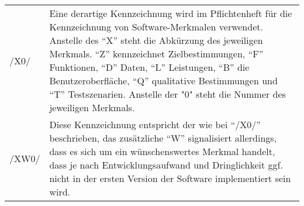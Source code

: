 \begin{tabular}{p{1.5cm}p{14.5cm}}

	/X0/	& Eine derartige Kennzeichnung wird im Pflichtenheft für die Kennzeichnung von Software-Merkmalen verwendet. Anstelle des "`X"' steht die Abkürzung des jeweiligen Merkmals. "`Z"' kennzeichnet Zielbestimmungen, "`F"' Funktionen, "`D"' Daten, "`L"' Leistungen, "`B"' die Benutzeroberfläche, "`Q"' qualitative Bestimmungen und "`T"' Testszenarien. Anstelle der "0" steht die Nummer des jeweiligen Merkmals.  \\
	/XW0/	& Diese Kennzeichnung entspricht der wie bei "`/X0/"' beschrieben, das zusätzliche "`W"' signalisiert allerdings, dass es sich um ein wünschenswertes Merkmal handelt, dass je nach Entwicklungsaufwand und Dringlichkeit ggf. nicht in der ersten Version der Software implementiert sein wird. \\

\end{tabular}